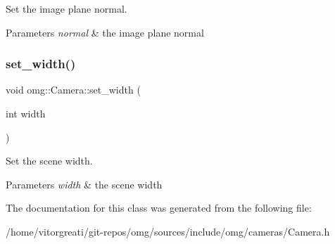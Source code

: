 Set the image plane normal. 


\begin{DoxyParams}{Parameters}
{\em normal} & the image plane normal \\
\hline
\end{DoxyParams}
\mbox{\label{classomg_1_1_camera_a3ef1ff0d4ca0deb6b32b5e08d7dcb159}} 
\subsubsection{\texorpdfstring{set\_width()}{set\_width()}}
{\footnotesize\ttfamily void omg\+::\+Camera\+::set\+\_\+width (\begin{DoxyParamCaption}\item[{int}]{width }\end{DoxyParamCaption})\hspace{0.3cm}{\ttfamily [inline]}}



Set the scene width. 


\begin{DoxyParams}{Parameters}
{\em width} & the scene width \\
\hline
\end{DoxyParams}


The documentation for this class was generated from the following file\+:\begin{DoxyCompactItemize}
\item 
/home/vitorgreati/git-\/repos/omg/sources/include/omg/cameras/Camera.\+h\end{DoxyCompactItemize}
